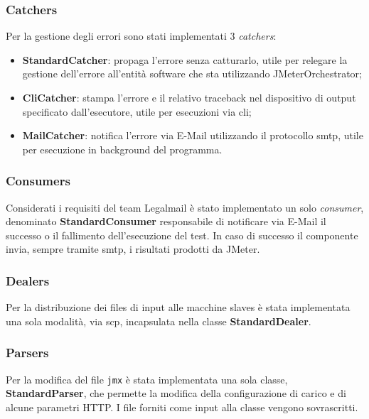 \subsubsection{Catchers}
Per la gestione degli errori sono stati implementati 3 \textit{catchers}:
\begin{itemize}
	\item \textbf{StandardCatcher}: propaga l'errore senza catturarlo, utile per relegare la gestione dell'errore all'entità software che sta utilizzando JMeterOrchestrator;
	\item \textbf{CliCatcher}: stampa l'errore e il relativo \gls{traceback} nel dispositivo di output specificato dall'esecutore, utile per esecuzioni via \gls{cli};
	\item \textbf{MailCatcher}: notifica l'errore via E-Mail utilizzando il protocollo \gls{smtp}, utile per esecuzione in background del programma.
\end{itemize}
\subsubsection{Consumers}
Considerati i requisiti del team Legalmail è stato implementato un solo \textit{consumer}, denominato \textbf{StandardConsumer} responsabile di notificare via E-Mail il successo o il fallimento dell'esecuzione del test. In caso di successo il componente invia, sempre tramite \gls{smtp}, i risultati prodotti da JMeter. 
\subsubsection{Dealers}
Per la distribuzione dei files di input alle macchine slaves è stata implementata una sola modalità, via \gls{scp}, incapsulata nella classe \textbf{StandardDealer}.
\subsubsection{Parsers}
Per la modifica del file \texttt{jmx} è stata implementata una sola classe, \textbf{StandardParser}, che permette la modifica della configurazione di carico e di alcune parametri HTTP. I file forniti come input alla classe vengono sovrascritti.
